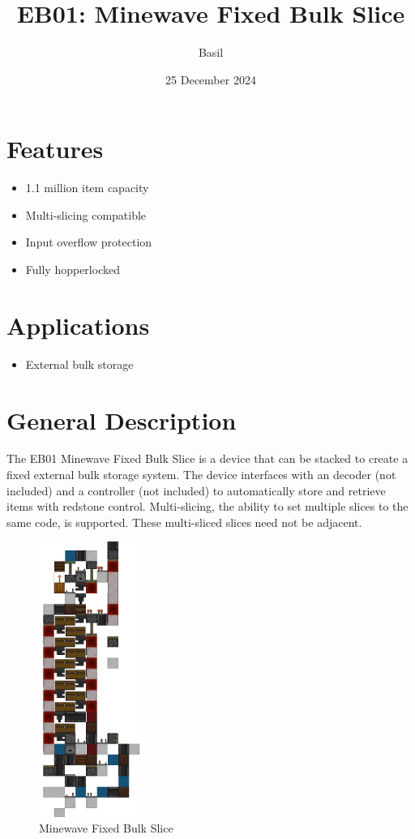 \documentclass[10pt]{datasheet}
\title{EB01: Minewave Fixed Bulk Slice}
\author{Basil}
\date{25 December 2024}
\begin{document}
\maketitle

\section{Features}

\begin{itemize}
\item{1.1 million item capacity}
\item{Multi-slicing compatible}
\item{Input overflow protection}
\item{Fully hopperlocked}
\end{itemize}

\section{Applications}

\begin{itemize}
\item{External bulk storage}
\end{itemize}

\section{General Description}
The EB01 Minewave Fixed Bulk Slice is a device that can be stacked to create a fixed external bulk storage system. The device interfaces with an decoder (not included) and a controller (not included) to automatically store and retrieve items with redstone control. Multi-slicing, the ability to set multiple slices to the same code, is supported. These multi-sliced slices need not be adjacent.

\vfill\break

\begin{figure}[H]
    \centering
    \includegraphics[width=0.3\textwidth]{area_render_15_.png}
    \caption{\centering Minewave Fixed Bulk Slice}
\end{figure}
\end{document}
